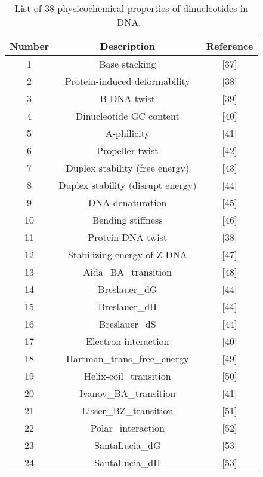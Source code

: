 \begin{footnotesize}
    \begin{longtable}{ccc}
        \caption{List of 38 physicochemical properties of dinucleotides in DNA.~\cite{Chen2014PseKNC:Composition}}
        \label{tab:38_di}
        \endfirsthead
        \endhead
        \toprule
        \textbf{Number} & \textbf{Description} & \textbf{Reference}\\\midrule
        
        1 & Base stacking	& [37] \\\midrule
        2 & Protein-induced deformability	& [38] \\\midrule
        3 & B-DNA twist	& [39] \\\midrule
        4 & Dinucleotide GC content	& [40] \\\midrule
        5 & A-philicity	& [41] \\\midrule
        6 & Propeller twist	& [42] \\\midrule
        7 & Duplex stability (free energy)	& [43] \\\midrule
        8 & Duplex stability (disrupt energy)	& [44] \\\midrule
        9 & DNA denaturation	& [45] \\\midrule
        10 & Bending stiffness	& [46] \\\midrule
        11 & Protein-DNA twist	& [38] \\\midrule
        12 & Stabilizing energy of Z-DNA	& [47] \\\midrule
        13 & Aida\_BA\_transition	& [48] \\\midrule
        14 & Breslauer\_dG	& [44] \\\midrule
        15 & Breslauer\_dH	& [44] \\\midrule
        16 & Breslauer\_dS	& [44] \\\midrule
        17 & Electron interaction	& [40] \\\midrule
        18 & Hartman\_trans\_free\_energy	& [49] \\\midrule
        19 & Helix-coil\_transition	& [50] \\\midrule
        20 & Ivanov\_BA\_transition	& [41] \\\midrule
        21 & Lisser\_BZ\_transition	& [51] \\\midrule
        22 & Polar\_interaction	& [52] \\\midrule
        23 & SantaLucia\_dG	& [53] \\\midrule
        24 & SantaLucia\_dH	& [53] \\\midrule

\end{longtable}
\end{footnotesize}
